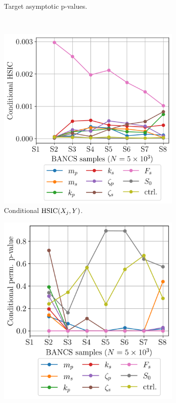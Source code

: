 \begin{figure}
\begin{subfigure}[b]{0.48\linewidth}
        \caption{Target asymptotic p-values.}
    \end{subfigure}
    \\[20pt]
    \begin{subfigure}[b]{0.48\linewidth}
        \centering
        \includegraphics[width=\linewidth]{part3/figures/BANCS/oscillator_CHSIC.png}
        \caption{Conditional $\mathrm{HSIC}(X_j, Y)$.}
    \end{subfigure}
    \hfill
    \begin{subfigure}[b]{0.48\linewidth}
        \centering
        \includegraphics[width=\linewidth]{part3/figures/BANCS/oscillator_Cpvalue_permutation.png}

\end{subfigure}
\end{figure}
